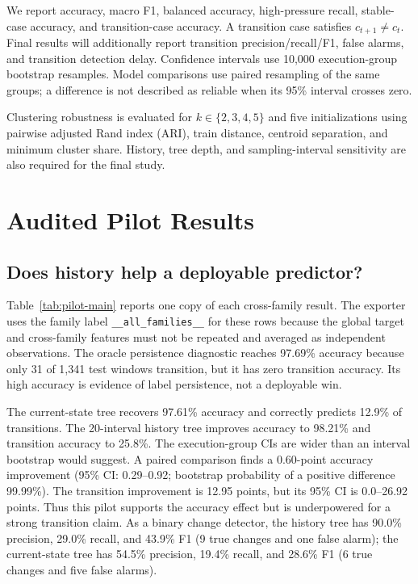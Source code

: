 \documentclass[conference,10pt]{IEEEtran}
\begin{document}
We report accuracy, macro F1, balanced accuracy, high-pressure recall, stable-case
accuracy, and transition-case accuracy. A transition case satisfies $c_{t+1}\ne c_t$.
Final results will additionally report transition precision/recall/F1, false alarms,
and transition detection delay. Confidence intervals use 10,000 execution-group
bootstrap resamples. Model comparisons use paired resampling of the same groups; a
difference is not described as reliable when its 95\% interval crosses zero.

Clustering robustness is evaluated for $k\in\{2,3,4,5\}$ and five initializations using
pairwise adjusted Rand index (ARI), train distance, centroid separation, and minimum
cluster share. History, tree depth, and sampling-interval sensitivity are also required
for the final study.

\section{Audited Pilot Results}

\subsection{Does history help a deployable predictor?}

Table~\ref{tab:pilot-main} reports one copy of each cross-family result. The exporter
uses the family label \texttt{\_\_all\_families\_\_} for these rows because the global
target and cross-family features must not be repeated and averaged as independent
observations. The oracle persistence diagnostic
reaches 97.69\% accuracy because only 31 of 1,341 test windows transition, but it has
zero transition accuracy. Its high accuracy is evidence of label persistence, not a
deployable win.

The current-state tree recovers 97.61\% accuracy and correctly predicts 12.9\% of
transitions. The 20-interval history tree improves accuracy to 98.21\% and transition
accuracy to 25.8\%. The execution-group CIs are wider than an interval bootstrap would
suggest. A paired comparison finds a 0.60-point accuracy improvement (95\% CI:
0.29--0.92; bootstrap probability of a positive difference 99.99\%). The transition
improvement is 12.95 points, but its 95\% CI is 0.0--26.92 points. Thus this pilot
supports the accuracy effect but is underpowered for a strong transition claim.
As a binary change detector, the history tree has 90.0\% precision, 29.0\% recall,
and 43.9\% F1 (9 true changes and one false alarm); the current-state tree has 54.5\%
precision, 19.4\% recall, and 28.6\% F1 (6 true changes and five false alarms).
\end{document}
